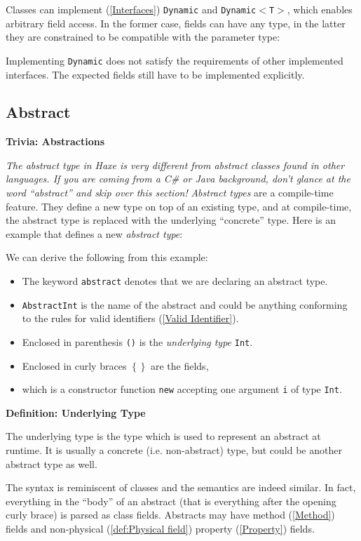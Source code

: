 \documentclass{article}
\newcommand{\type}[1]{\texttt{#1}}
\newcommand{\expr}[1]{\texttt{#1}}
\newenvironment{myshaded}
  {\def\FrameCommand{\fboxsep=\topsep\colorbox{bgcolor}}%
  \MakeFramed {\advance\hsize-\width \FrameRestore}}%
 {\endMakeFramed}
\newcommand{\define}[3][Definition]
	{\begin{myshaded}\noindent\textbf{#1: #2}\par\nobreak\noindent\ignorespaces#3\label{def:#2}\end{myshaded}}
\newcommand{\trivia}[2]
	{\begin{myshaded}\noindent\textbf{Trivia: #1}\par\nobreak\noindent\ignorespaces\textit{#2}\end{myshaded}}
\newcommand{\tref}[2]{#1 (\ref{#2})}
\newcommand{\haxe}[2][]{%
}
\begin{document}
Classes can \tref{implement}{Interfaces} \type{Dynamic} and \type{Dynamic$<$T$>$}, which enables arbitrary field access. In the former case, fields can have any type, in the latter they are constrained to be compatible with the parameter type:

\haxe{assets/ImplementsDynamic.hx}
Implementing \type{Dynamic} does not satisfy the requirements of other implemented interfaces. The expected fields still have to be implemented explicitly.





\subsection{Abstract}
\label{Abstract}

\trivia{Abstractions}{The abstract type in Haxe is very different from abstract classes found in other languages.  If you are coming from a C\# or Java background, don't glance at the word ``abstract'' and skip over this section!}   
\emph{Abstract types} are a compile-time feature.  They define a new type on top of an existing type, and at compile-time, the abstract type is replaced with the underlying ``concrete'' type.    
Here is an example that defines a new \emph{abstract type}:
\haxe[firstline=1,lastline=5]{assets/MyAbstract.hx}
We can derive the following from this example:

\begin{itemize}
	\item The keyword \expr{abstract} denotes that we are declaring an abstract type.
	\item \type{AbstractInt} is the name of the abstract and could be anything conforming to the rules for \tref{valid identifiers}{Valid Identifier}.
	\item Enclosed in parenthesis \expr{()} is the \emph{underlying type} \type{Int}.
	\item Enclosed in curly braces \expr{$\left\{\right\}$} are the fields,
	\item which is a constructor function \expr{new} accepting one argument \expr{i} of type \type{Int}.
\end{itemize}

\define{Underlying Type}{The underlying type is the type which is used to represent an abstract at runtime. It is usually a concrete (i.e. non-abstract) type, but could be another abstract type as well.}

The syntax is reminiscent of classes and the semantics are indeed similar. In fact, everything in the ``body'' of an abstract (that is everything after the opening curly brace) is parsed as class fields. Abstracts may have \tref{method}{Method} fields and non-\tref{physical}{def:Physical field} \tref{property}{Property} fields.
\end{document}
